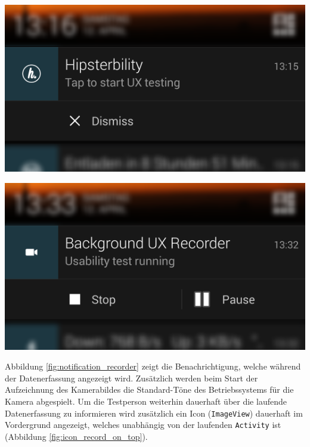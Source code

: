 \begin{minipage}[t]{0.45\linewidth}
	\centering
	\includegraphics[width=\linewidth]{img/notification_main}
	 \label{fig:notification_main}
\end{minipage}
\hfill
\begin{minipage}[t]{0.45\linewidth}
	\centering
	\includegraphics[width=\linewidth]{img/notification_background_recorder}
	 \label{fig:notification_recorder}
\end{minipage}


Abbildung \ref{fig:notification_recorder} zeigt die Benachrichtigung, welche während der Datenerfassung angezeigt wird.
Zusätzlich werden beim Start der Aufzeichnung des Kamerabildes die Standard-Töne des Betriebssystems für die Kamera abgespielt.
Um die Testperson weiterhin dauerhaft über die laufende Datenerfassung zu informieren wird zusätzlich ein Icon (\texttt{ImageView}) dauerhaft im Vordergrund angezeigt, welches unabhängig von der laufenden \texttt{Activity} ist (Abbildung \ref{fig:icon_record_on_top}).

